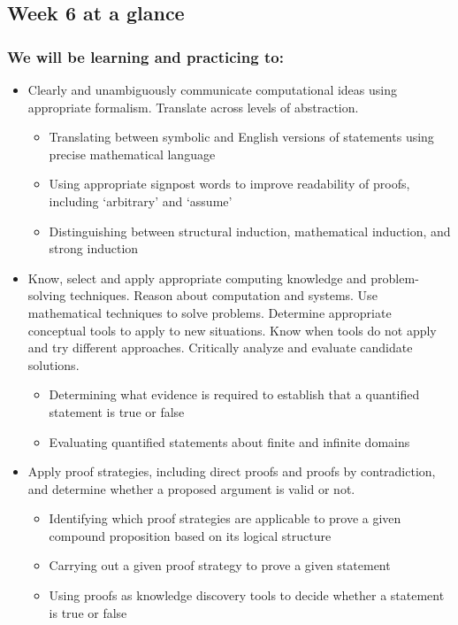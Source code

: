 

\subsection*{Week 6 at a glance}

\subsubsection*{We will be learning and practicing to:}
\begin{itemize}

\item Clearly and unambiguously communicate computational ideas using appropriate formalism. Translate across levels of abstraction.
\begin{itemize}
   \item Translating between symbolic and English versions of statements using precise mathematical language
    \item Using appropriate signpost words to improve readability of proofs, including `arbitrary' and `assume'
    \item Distinguishing between structural induction, mathematical induction, and strong induction
\end{itemize}

\item Know, select and apply appropriate computing knowledge and problem-solving techniques. Reason about computation and systems. Use mathematical techniques to solve problems. Determine appropriate conceptual tools to apply to new situations. Know when tools do not apply and try different approaches. Critically analyze and evaluate candidate solutions.
\begin{itemize}
    \item Determining what evidence is required to establish that a quantified statement is true or false
    \item Evaluating quantified statements about finite and infinite domains
\end{itemize}

\item Apply proof strategies, including direct proofs and proofs by contradiction, and determine whether a proposed argument is valid or not.
\begin{itemize}
    \item Identifying which proof strategies are applicable to prove a given compound proposition based on its logical structure
    \item Carrying out a given proof strategy to prove a given statement
    \item Using proofs as knowledge discovery tools to decide whether a statement is true or false
\end{itemize}


\end{itemize}
